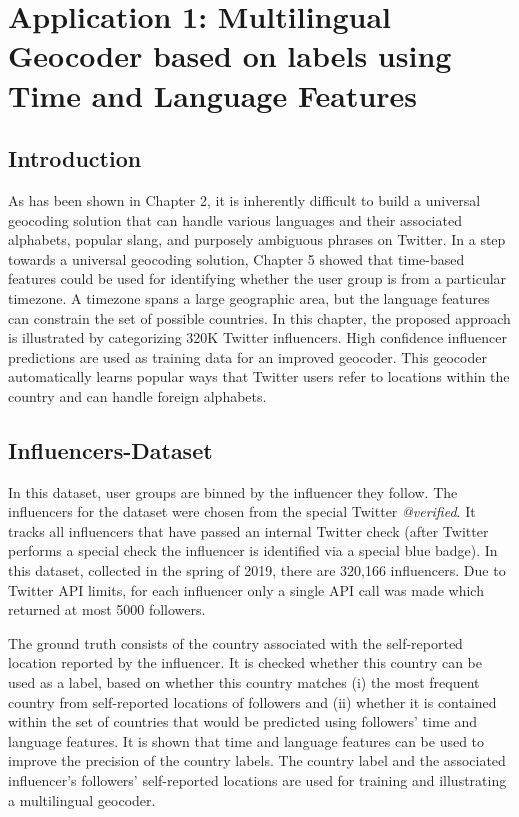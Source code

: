 \chapter{Application 1: Multilingual Geocoder based on labels using Time and Language Features}\label{chap:ch6}

\section{Introduction}
As has been shown in Chapter 2, it is inherently difficult to build a universal geocoding solution that can handle various languages and their associated alphabets, popular slang, and purposely ambiguous phrases on Twitter. In a step towards a universal geocoding solution, Chapter 5 showed that time-based features could be used for identifying whether the user group is from a particular timezone. A timezone spans a large geographic area, but the language features can constrain the set of possible countries. In this chapter, the proposed approach is illustrated by categorizing 320K Twitter influencers. High confidence influencer predictions are used as training data for an improved geocoder. This geocoder automatically learns popular ways that Twitter users refer to locations within the country and can handle foreign alphabets.

\section{Influencers-Dataset}

In this dataset, user groups are binned by the influencer they follow. The influencers for the dataset were chosen from the special Twitter \emph{@verified}. It tracks all influencers that have passed an internal Twitter check (after Twitter performs a special check the influencer is identified via a special blue badge). In this dataset, collected in the spring of 2019, there are 320,166 influencers. Due to Twitter API limits, for each influencer only a single API call was made which returned at most 5000 followers.

The ground truth consists of the country associated with the self-reported location reported by the influencer. It is checked whether this country can be used as a label, based on whether this country matches (i) the most frequent country from self-reported locations of followers and (ii) whether it is contained within the set of countries that would be predicted using followers' time and language features. It is shown that time and language features can be used to improve the precision of the country labels. The country label and the associated influencer's followers' self-reported locations are used for training and illustrating a multilingual geocoder. 

